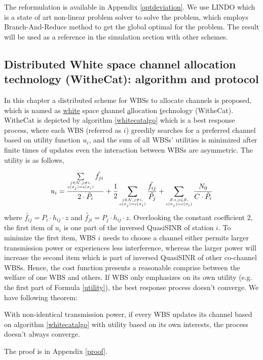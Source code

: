 The reformulation is available in Appendix \ref{optdeviation}. We use LINDO\cite{lindo} which is a state of art non-linear problem solver to solve the problem, which employs Branch-And-Reduce method to get the global optimal for the problem. %
The result will be used as a reference in the simulation section with other schemes. 



\subsection{Distributed White space channel allocation technology (WitheCat): algorithm and protocol}
\label{whitecat}
In this chapter a distributed scheme for WBSs to allocate channels is proposed,  which is named as \underline{white} space \underline{c}hannel \underline{a}llocation \underline{t}echnology (WitheCat). WitheCat is depicted by algorithm \ref{whitecatalgo} which is a best response process, where each WBS (referred as $i$) greedily searches for a preferred channel based on utility function $u_i$, and the sum of all WBSs' utilities is minimized after finite times of updates even the interaction between WBSs are asymmetric. The utility is as follows,

\begin{equation}
\label{utility}
u_i =\dfrac{\sum\limits_{\tiny\substack{j\in \mathcal{N}, j\ne i,\\ c(\sigma_j)=c(\sigma_i)}}\tilde{f_{ji}}}{2\cdot \tilde{P_i}} + \dfrac{1}{2}\sum_{\tiny\substack{j\in \mathcal{N}, j\ne i,\\ c(\sigma_j)=c(\sigma_i)}}\dfrac{\tilde{f_{ij}}}{\tilde{P_j}} + \sum_{\tiny\substack{\mathcal{S}:i,j\in \mathcal{S},\\ c(\sigma_j)=c(\sigma_i)}}\dfrac{N_0}{C\cdot \tilde{P_i}}\\
\end{equation}
where $\tilde{f_{ij}}= P_i\cdot h_{ij}\cdot z$ and $\tilde{f_{ji}}= P_j\cdot h_{ij}\cdot z$.
Overlooking the constant coefficient 2, the first item of $u_i$ is one part of the inversed QuasiSINR of station $i$. To minimize the first item, WBS $i$ needs to choose a channel either permits larger transmission power or experiences less interference, whereas the larger power will increase the second item which is part of inversed QuasiSINR of other co-channel WBSs. Hence, the cost function presents a reasonable comprise between the welfare of one WBS and others. If WBS only emphasizes on its own utility (e.g. the first part of Formula \ref{utility}), the best response process doesn't converge. We have following theorem:
\begin{theorem}
\label{noconvergence}
With non-identical transmission power, if every WBS updates its channel based on algorithm \ref{whitecatalgo} with utility based on its own interests, the process doesn't always converge.
\end{theorem}
The proof is in Appendix \ref{proof}.


